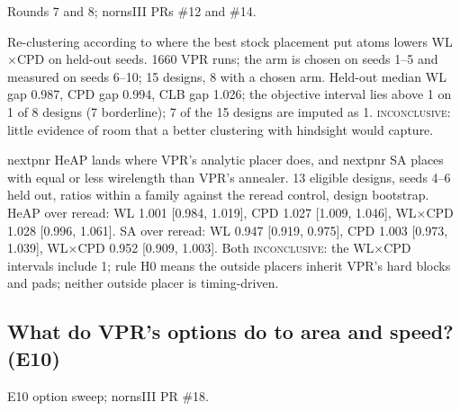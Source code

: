  Rounds 7 and 8; nornsIII PRs \#12 and \#14.

 Re-clustering according to where the best stock placement put atoms lowers WL$\times$CPD on held-out seeds.
 1660 VPR runs; the arm is chosen on seeds 1--5 and measured on seeds 6--10; 15 designs, 8 with a chosen arm.
 Held-out median WL gap 0.987, CPD gap 0.994, CLB gap 1.026; the objective interval lies above 1 on 1 of 8 designs (7 borderline); 7 of the 15 designs are imputed as 1. %
 \textsc{inconclusive}: little evidence of room that a better clustering with hindsight would capture.

 nextpnr HeAP lands where VPR's analytic placer does, and nextpnr SA places with equal or less wirelength than VPR's annealer.
 13 eligible designs, seeds 4--6 held out, ratios within a family against the reread control, design bootstrap.
 HeAP over reread: WL 1.001 [0.984, 1.019], CPD 1.027 [1.009, 1.046], WL$\times$CPD 1.028 [0.996, 1.061]. SA over reread: WL 0.947 [0.919, 0.975], CPD 1.003 [0.973, 1.039], WL$\times$CPD 0.952 [0.909, 1.003]. %
 Both \textsc{inconclusive}: the WL$\times$CPD intervals include 1; rule H0 means the outside placers inherit VPR's hard blocks and pads; neither outside placer is timing-driven.

\subsection{What do VPR's options do to area and speed? (E10)}
\label{sec:e10}

 E10 option sweep; nornsIII PR \#18.

